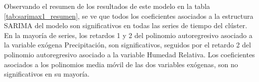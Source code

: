 \documentclass[12pt,oneside]{book}\usepackage[]{graphicx}\usepackage[]{color}
\newenvironment{knitrout}{}{} %
\theoremstyle{definition} %
\begin{document}
Observando el resumen de los resultados de este modelo en la tabla \ref{tab:sarimax1_resumen}, se ve que todos los coeficientes asociados a la estructura SARIMA del modelo son significativos en todas las series de tiempo del clúster. En la mayoría de series, los retardos 1 y 2 del polinomio autoregresivo asociado a la variable exógena Precipitación, son significativos, seguidos por el retardo 2 del polinomio autoregresivo asociado a la variable Humedad Relativa. Los coeficientes asociados a los polinomios media móvil de las dos variables exógenas, son no significativos en su mayoría.






\begin{knitrout}
\color{fgcolor}
\begin{landscape}\begin{table}


\end{table}
\end{landscape}
\end{knitrout}
\end{document}
